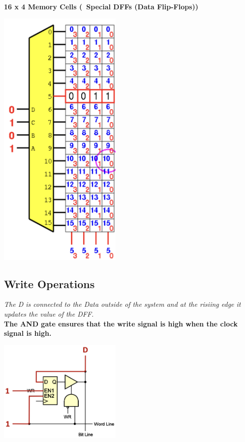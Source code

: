 \begin{minipage}[htp]{0.45\textwidth}
    \textbf{16 x 4 Memory Cells (~Special DFFs (Data Flip-Flops))} \\ \vspace*{5px}
\begin{center}
    \includegraphics[width=0.45\textwidth]{chapters/chapter1c/images/structure.png}
\end{center}
\end{minipage}
\subsection{Write Operations}
\textit{The D is connected to the Data outside of the system and at the risiing edge it updates the value of the DFF.} \\ \vspace*{5px}
\textbf{The AND gate ensures that the write signal is high when the clock signal is high.} \\ \vspace*{5px}
\begin{center}
    \includegraphics[width=0.45\textwidth]{chapters/chapter1c/images/write.png}
\end{center}
